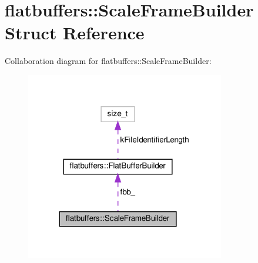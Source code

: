 \hypertarget{structflatbuffers_1_1ScaleFrameBuilder}{}\section{flatbuffers\+:\+:Scale\+Frame\+Builder Struct Reference}
\label{structflatbuffers_1_1ScaleFrameBuilder}


Collaboration diagram for flatbuffers\+:\+:Scale\+Frame\+Builder\+:
\nopagebreak
\begin{figure}[H]
\begin{center}
\leavevmode
\includegraphics[width=246pt]{structflatbuffers_1_1ScaleFrameBuilder__coll__graph}
\end{center}
\end{figure}
